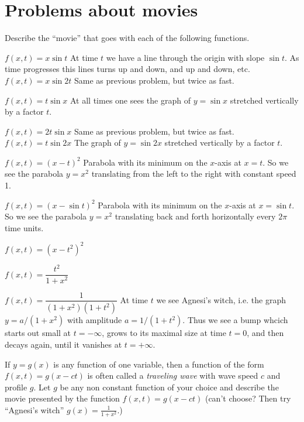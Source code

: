 \section*{Problems about movies} %
\problem  Describe the ``movie'' that goes with each of the following%
functions.

\subprob $f(x, t) = x\sin t$\hspace{6em}
\answer%
At time $t$ we have a line through the origin with slope $\sin t$.
As time progresses this lines turns up and down, and up and down,  etc.
\endanswer
\subprob $f(x, t) = x\sin 2t$\hspace{6em}
\answer%
Same as previous problem, but twice as fast.
\endanswer

\subprob $f(x, t) = t\sin x$
\answer%
At all times one sees the graph of $y=\sin x$ stretched vertically by a factor $t$.
\endanswer

\subprob $f(x, t) = 2t \sin x$
\answer%
Same as previous problem, but twice as fast.
\endanswer
\subprob $f(x, t) = t\sin 2x$
\answer%
The graph of $y=\sin 2x$ stretched vertically by a factor $t$.
\endanswer

\subprob $f(x, t) = (x-t)^2$
\answer%
Parabola with its minimum on the $x$-axis at $x=t$.
So we see the parabola $y=x^2$ translating from the left to the right
with constant speed 1.
\endanswer

\subprob $f(x, t) = (x-\sin t)^2$
\answer%
Parabola with its minimum on the $x$-axis at $x=\sin t$.
So we see the parabola $y=x^2$ translating back and forth horizontally
every $2\pi$ time units.
\endanswer

\subprob $f(x, t) = (x-t^2)^2$

\subprob $f(x, t) = \dfrac{t^2}{1+x^2}$

\subprob $f(x, t) = \dfrac{1}{(1+x^2) (1+t^2)}$
\answer%
At time $t$ we see Agnesi's witch, i.e. the graph $y= a/(1+x^2)$
with amplitude $a=1/(1+t^2)$.  Thus we see a bump whcich starts out small
 at $t=-\infty$, grows to its maximal size at time $t=0$, and then decays
again, until it vanishes at $t=+\infty$.
\endanswer


\problem
\label{prb:01traveling-waves}
If $y=g(x)$ is any function of one variable, then a function of the
form $f(x, t) = g(x-ct)$ is often called a \emph{traveling wave} with
wave speed $c$ and profile $g$.  Let $g$ be any non constant
function of your choice and describe the movie presented by the
function $f(x, t) = g(x-ct)$ (can't choose?  Then try ``Agnesi's
witch'' $g(x) = \frac{1}{1+x^2}$.)


